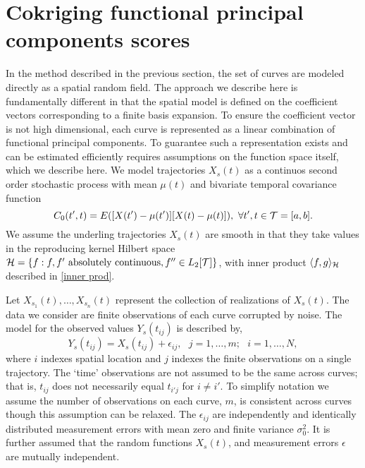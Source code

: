 \section{Cokriging functional principal components scores} %
\label{sec:cokriging_functional_principal_compents_scores}
In the method described in the previous section, the set of curves are modeled directly as a spatial random field. The approach we describe here is fundamentally different in that the spatial model is defined on the coefficient vectors corresponding to a finite basis expansion. To ensure the coefficient vector is not high dimensional, each curve is represented as a linear combination of functional principal components. To guarantee such a representation exists and can be estimated efficiently requires assumptions on the function space itself, which we describe here. 
  We model trajectories $X_s(t)$ as a continuos second order stochastic process with mean $\mu(t)$ and bivariate temporal covariance function
\begin{equation}
	C_{0}(t',t)=E([X(t')-\mu(t')][X(t)-\mu(t)]),\mbox{ }\forall t',t\in \mathcal{T}=[a,b]. 
\end{equation} 
 We assume the underling trajectories $X_s(t)$ are smooth in that they take values in the reproducing kernel Hilbert space $\mathcal{H}= \{f : f, f' \mbox{ absolutely continuous}, f'' \in L_2[\mathcal{T}]\}$, with inner product $\langle f, g \rangle_{\mathcal{H}}$ described in \eqref{inner prod}.

Let $X_{s_1}(t), \dots, X_{s_n}(t)$ represent the collection of realizations of $X_s(t)$. The data we consider are finite observations of each curve corrupted by noise. The model for the observed values $Y_s(t_{ij})$ is described by,
\begin{equation}
	Y_s(t_{ij})=X_s(t_{ij})+\epsilon_{ij},\mbox{ }j=1,\dots,m;\mbox{ }i=1,\dots,N, \label{kriging:observation model}
\end{equation} 
where $i$ indexes spatial location and $j$ indexes the finite observations on a single trajectory. The `time' observations are not assumed to be the same across curves; that is, $t_{ij}$ does not necessarily equal $t_{i'j}$ for $i \neq i'$. To simplify notation we assume the number of observations on each curve, $m$, is consistent across curves though this assumption can be relaxed. The $\epsilon_{ij}$ are independently and identically distributed measurement errors with mean zero and finite variance $\sigma_{0}^{2}.$ It is further assumed that the random functions $X_s(t)$, and measurement errors $\epsilon$ are mutually independent. 

